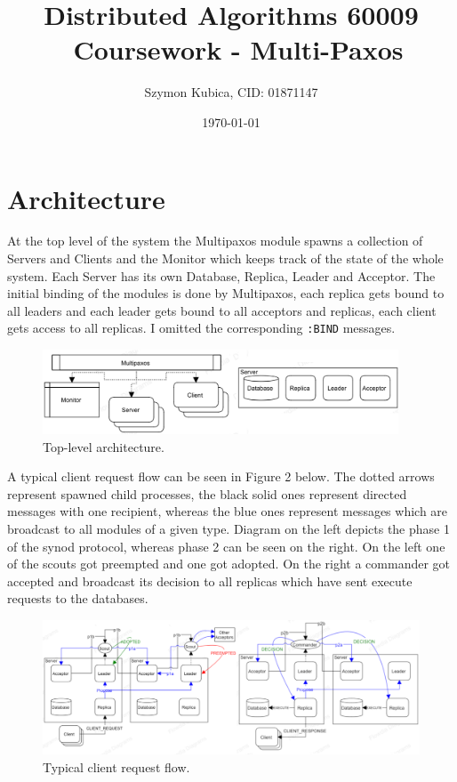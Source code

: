 \documentclass[11pt]{article}
\begin{document}
\title{Distributed Algorithms 60009 \ Coursework - Multi-Paxos}
\date{\today}
\author{Szymon Kubica, CID: 01871147}
 {\let\newpage\relax\maketitle}

\section*{Architecture}
At the top level of the system the Multipaxos module spawns a collection of
Servers and Clients and the Monitor which keeps track of the state of the whole
system. Each Server has its own Database, Replica, Leader and Acceptor. The
initial binding of the modules is done by Multipaxos, each replica gets bound
to all leaders and each leader gets bound to all acceptors and replicas,
each client gets access to all replicas. I omitted the corresponding \texttt{:BIND}
messages.
\begin{figure}[H]
    \centering
    \includegraphics[width=400px]{architecture0.png}
    \caption{Top-level architecture.}
    \vspace{-15pt}
\end{figure}
A typical client request flow can be seen in Figure 2 below. The dotted arrows
represent spawned child processes, the black solid ones represent directed messages
with one recipient, whereas the blue ones represent messages which are broadcast
to all modules of a given type. Diagram on the left depicts the phase 1 of the synod protocol,
whereas phase 2 can be seen on the right. On the left one of the scouts
got preempted and one got adopted. On the right a commander got accepted
and broadcast its decision to all replicas which have
sent execute requests to the databases.
    \vspace{-5pt}
\begin{figure}[H]
    \centering
    \includegraphics[width=\textwidth]{architecture1.png}
    \caption{Typical client request flow.}
\end{figure}
\end{document}
